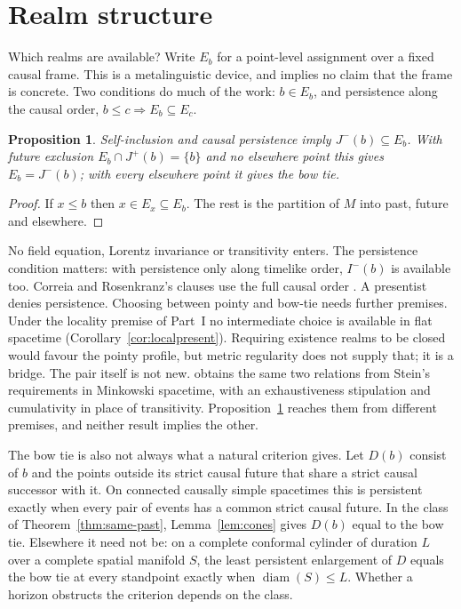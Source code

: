 \documentclass[11pt]{article}
\newtheorem{proposition}[theorem]{Proposition}
\theoremstyle{definition}
\newcommand{\Ichr}{I^{-}}
\newcommand{\Jp}{J^{+}}
\newcommand{\Jm}{J^{-}}
\begin{document}
\section{Realm structure}\label{sec:realms}

Which realms are available? Write $E_b$ for a point-level assignment over a fixed causal frame.
This is a metalinguistic device, and implies no claim that the frame is concrete. Two conditions do
much of the work: $b\in E_b$, and persistence along the causal order, $b\le c\Rightarrow E_b\subseteq E_c$.

\begin{proposition}\label{prop:sp}
Self-inclusion and causal persistence imply $\Jm(b)\subseteq E_b$. With future exclusion
$E_b\cap\Jp(b)=\{b\}$ and no elsewhere point this gives $E_b=\Jm(b)$; with every elsewhere point it gives
the bow tie.
\end{proposition}

\begin{proof}
If $x\le b$ then $x\in E_x\subseteq E_b$. The rest is the partition of $M$ into past, future and elsewhere.
\end{proof}

No field equation, Lorentz invariance or transitivity enters. The persistence condition matters:
with persistence only along timelike order, $\Ichr(b)$ is available too. Correia and Rosenkranz's
clauses use the full causal order \citep[pp.~144, 148--149]{CR2018}. A presentist denies persistence.
Choosing between pointy and bow-tie needs further premises. Under the locality premise of Part~I no intermediate choice is available in flat spacetime (Corollary~\ref{cor:localpresent}). Requiring existence realms to be closed
would favour the pointy profile, but metric regularity does not supply that; it is a bridge.
The pair itself is not new. \citet{Bigaj2008} obtains the same two relations from Stein's requirements
in Minkowski spacetime, with an exhaustiveness stipulation and cumulativity in place of transitivity.
Proposition~\ref{prop:sp} reaches them from different premises, and neither result implies the other.

The bow tie is also not always what a natural criterion gives. Let $D(b)$ consist of $b$ and the points
outside its strict causal future that share a strict causal successor with it. On connected causally simple spacetimes this is persistent exactly when every pair of events has a common strict causal future. In the class of
Theorem~\ref{thm:same-past}, Lemma~\ref{lem:cones} gives $D(b)$ equal to the bow tie. Elsewhere it need
not be: on a complete conformal cylinder of duration $L$ over a complete spatial manifold $S$, the least
persistent enlargement of $D$ equals the bow tie at every standpoint exactly when
$\operatorname{diam}(S)\le L$. Whether a horizon obstructs the criterion depends on the class.
\end{document}
